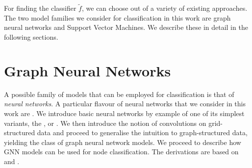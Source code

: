 \documentclass[
	fontsize=10pt, %
	twoside=true, %
	secnumdepth=1, %
  toc=indentunnumbered %
]{kaobook}
\begin{document}
For finding the classifier $\tilde f$, we can choose out of a variety of
existing approaches. The two model families we consider for classification in
this work are graph neural networks and Support Vector Machines. We describe
these in detail in the following sections.






\section{Graph Neural Networks}
\label{sec:neural-networks}



A possible family of models that can be employed for classification is that of
\textit{neural networks}. A particular flavour of neural networks that we
consider in this work are . We introduce basic neural
networks by example of one of its simplest variants, the , or . We then
introduce the notion of convolutions on grid-structured data and proceed to
generalise the intuition to graph-structured data, yielding the class of graph
neural network models. We proceed to describe how GNN models can be used for
node classification. The derivations are based on \citeauthor{zhang_dive_nodate}
\cite{zhang_dive_nodate} and \citeauthor{bronstein_geometric_2021}
\cite{bronstein_geometric_2021}.
\end{document}
